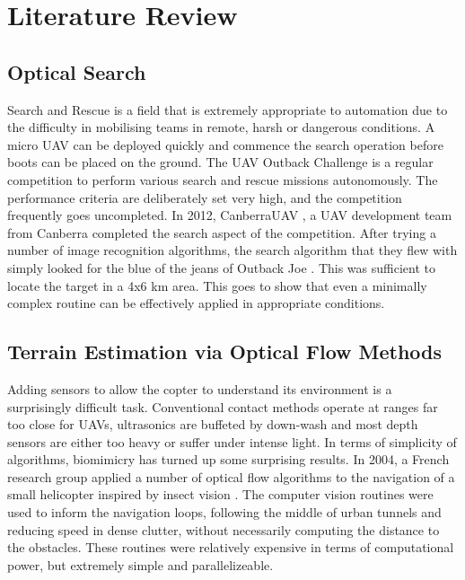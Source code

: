 \documentclass[a4paper, 11pt, titlepage]{article}
\begin{document}
  \section{Literature Review}

    \subsection{Optical Search}
      Search and Rescue is a field that is extremely appropriate to automation due to the difficulty in mobilising teams in remote, harsh or dangerous conditions.  A micro UAV can be deployed quickly and commence the search operation before boots can be placed on the ground.
      The UAV Outback Challenge \cite{OutbackChallenge} is a regular competition to perform various search and rescue missions autonomously.  The performance criteria are deliberately set very high, and the competition frequently goes uncompleted.  
      In 2012, CanberraUAV \cite{canberrauav}, a UAV development team from Canberra completed the search aspect of the competition.
      After trying a number of image recognition algorithms, the search algorithm that they flew with simply looked for the blue of the jeans of Outback Joe \cite{tridge}. This was sufficient to locate the target in a 4x6 km area.  This goes to show that even a minimally complex routine can be effectively applied in appropriate conditions.

    \subsection{Terrain Estimation via Optical Flow Methods}
      Adding sensors to allow the copter to understand its environment is a surprisingly difficult task.  Conventional contact methods operate at ranges far too close for UAVs, ultrasonics are buffeted by down-wash and most depth sensors are either too heavy or suffer under intense light.
      In terms of simplicity of algorithms, biomimicry has turned up some surprising results.  In 2004, a French research group applied a number of optical flow algorithms to the navigation of a small helicopter inspired by insect vision \cite{InsectFlowMethods}.  The computer vision routines were used to inform the navigation loops, following the middle of urban tunnels and reducing speed in dense clutter, without necessarily computing the distance to the obstacles.  These routines were relatively expensive in terms of computational power, but extremely simple and parallelizeable.
\end{document}
